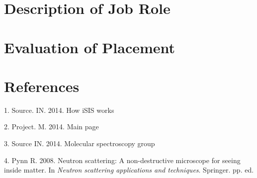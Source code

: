 \documentclass[paper=a4, fontsize=11pt]{scrartcl}	%
\numberwithin{equation}{section}															%
\numberwithin{figure}{section}																%
\numberwithin{table}{section}
\begin{document}
\section{Description of Job Role}\label{description-of-job-role}

\section{Evaluation of Placement}\label{evaluation-of-placement}

\section*{References}\label{references}

1. Source. IN. 2014. How iSIS works

2. Project. M. 2014. Main page

3. Source IN. 2014. Molecular spectroscopy group

4. Pynn R. 2008. Neutron scattering: A non-destructive microscope for
seeing inside matter. In \emph{Neutron scattering applications and
techniques}. Springer. pp. ed.
\end{document}
